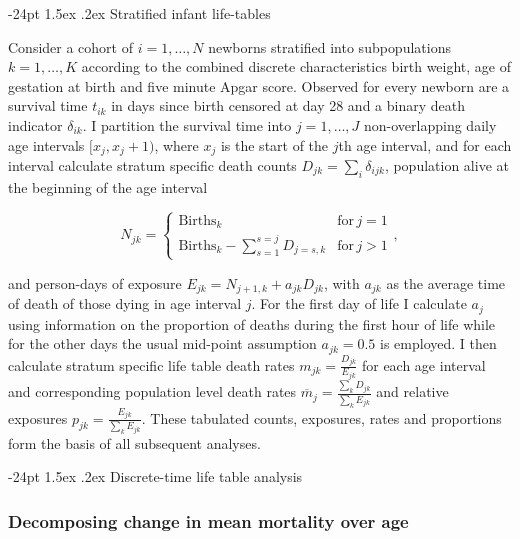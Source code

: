 \documentclass[10pt,twoside,reqno]{article}
\makeatletter
\renewcommand\subsection{\@startsection{subsection}{2}{\z@}%
                                     {-24pt}%
                                     {1.5ex \@plus .2ex}%
                                     {\normalfont\normalsize\bfseries}}
\makeatother
\begin{document}
\subsection{Stratified infant life-tables}\label{stratified-infant-life-tables}

Consider a cohort of \(i=1,\ldots,N\) newborns stratified into subpopulations \(k=1,\ldots,K\) according to the combined discrete characteristics birth weight, age of gestation at birth and five minute Apgar score. Observed for every newborn are a survival time \(t_{ik}\) in days since birth censored at day 28 and a binary death indicator \(\delta_{ik}\). I partition the survival time into \(j=1,\ldots,J\) non-overlapping daily age intervals \([x_j, x_j+1)\), where \(x_j\) is the start of the \(j\)th age interval, and for each interval calculate stratum specific death counts \({D_{jk}=\sum_{i}\delta_{ijk}}\), population alive at the beginning of the age interval

\[
N_{jk}=\begin{cases}\text{Births}_k & \text{for}\,j=1\\ \text{Births}_k-\sum^{s=j}_{s=1}D_{j=s,k} & \text{for}\,j>1\end{cases},
\]

and person-days of exposure \(E_{jk}=N_{j+1,k}+a_{jk}D_{jk}\), with \(a_{jk}\) as the average time of death of those dying in age interval \(j\). For the first day of life I calculate \(a_j\) using information on the proportion of deaths during the first hour of life while for the other days the usual mid-point assumption \(a_{jk}=0.5\) is employed. I then calculate stratum specific life table death rates \(m_{jk}=\frac{D_{jk}}{E_{jk}}\) for each age interval and corresponding population level death rates \(\overline{m}_j=\frac{\sum_k D_{jk}}{\sum_k E_{jk}}\) and relative exposures \(p_{jk} = \frac{E_{jk}}{\sum_k E_{jk}}\). These tabulated counts, exposures, rates and proportions form the basis of all subsequent analyses.

\subsection{Discrete-time life table analysis}\label{discrete-time-life-table-analysis}

\subsubsection*{Decomposing change in mean mortality over age}\label{decomposing-change-in-mean-mortality-over-age}
\end{document}
